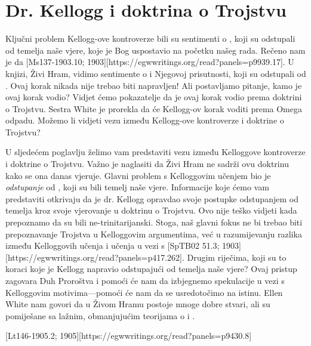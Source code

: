 \chapter{Dr. Kellogg i doktrina o Trojstvu}

Ključni problem Kellogg-ove kontroverze bili su sentimenti o , koji su odstupali od temelja naše vjere, koje je Bog uspostavio na početku našeg rada. Rečeno nam je da [Ms137-1903.10; 1903][https://egwwritings.org/read?panels=p9939.17]. U knjizi, Živi Hram, vidimo sentimente o  i Njegovoj prisutnosti, koji su odstupali od . Ovaj korak nikada nije trebao biti napravljen! Ali postavljamo pitanje, kamo je ovaj korak vodio? Vidjet ćemo pokazatelje da je ovaj korak vodio prema doktrini o Trojstvu. Sestra White je prorekla da će Kellogg-ov korak voditi prema Omega odpadu. Možemo li vidjeti vezu između Kellogg-ove kontroverze i doktrine o Trojstvu?

U sljedećem poglavlju želimo vam predstaviti vezu između Kelloggove kontroverze i doktrine o Trojstvu. Važno je naglasiti da Živi Hram ne sadrži ovu doktrinu kako se ona danas vjeruje. Glavni problem s Kelloggovim učenjem bio je \textit{odstupanje} od , koji su bili temelj naše vjere. Informacije koje ćemo vam predstaviti otkrivaju da je dr. Kellogg opravdao svoje postupke odstupanjem od temelja kroz svoje vjerovanje u doktrinu o Trojstvu. Ovo nije teško vidjeti kada prepoznamo da su  bili ne-trinitarijanski. Stoga, naš glavni fokus ne bi trebao biti prepoznavanje Trojstva u Kelloggovim argumentima, već u razumijevanju razlika između Kelloggovih učenja i učenja  u vezi s [SpTB02 51.3; 1903][https://egwwritings.org/read?panels=p417.262]. Drugim riječima, koji su to koraci koje je Kellogg napravio odstupajući od temelja naše vjere? Ovaj pristup zagovara Duh Proroštva i pomoći će nam da izbjegnemo spekulacije u vezi s Kelloggovim motivima—pomoći će nam da se usredotočimo na istinu. Ellen White nam govori da u Živom Hramu postoje mnoge dobre stvari, ali su pomiješane sa lažnim, obmanjujućim teorijama o  i .

[Lt146-1905.2; 1905][https://egwwritings.org/read?panels=p9430.8]

